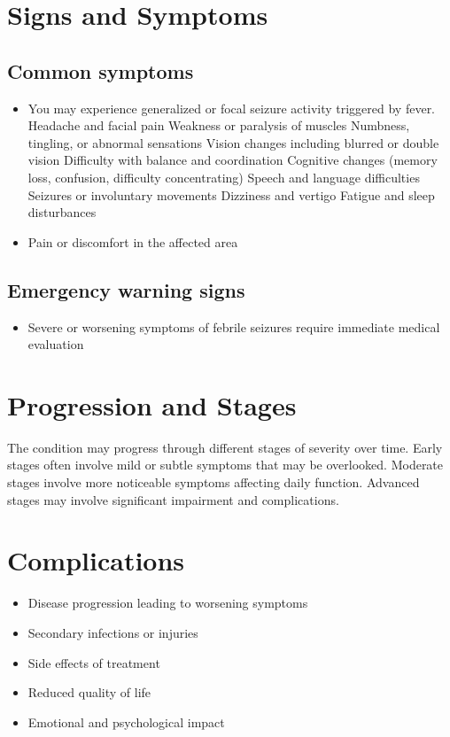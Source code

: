 \section{Signs and Symptoms}

\subsection{Common symptoms}
\begin{itemize}[noitemsep]
  \item You may experience generalized or focal seizure activity triggered by fever. Headache and facial pain Weakness or paralysis of muscles Numbness, tingling, or abnormal sensations Vision changes including blurred or double vision Difficulty with balance and coordination Cognitive changes (memory loss, confusion, difficulty concentrating) Speech and language difficulties Seizures or involuntary movements Dizziness and vertigo Fatigue and sleep disturbances

  \item Pain or discomfort in the affected area
  \end{itemize}

\subsection{Emergency warning signs}
\begin{itemize}[noitemsep]
  \item Severe or worsening symptoms of febrile seizures require immediate medical evaluation
\end{itemize}
\section{Progression and Stages}
The condition may progress through different stages of severity over time. Early stages often involve mild or subtle symptoms that may be overlooked. Moderate stages involve more noticeable symptoms affecting daily function. Advanced stages may involve significant impairment and complications.
\section{Complications}
\begin{itemize}[noitemsep]
  \item Disease progression leading to worsening symptoms
  \item Secondary infections or injuries
  \item Side effects of treatment
  \item Reduced quality of life
  \item Emotional and psychological impact
\end{itemize}

